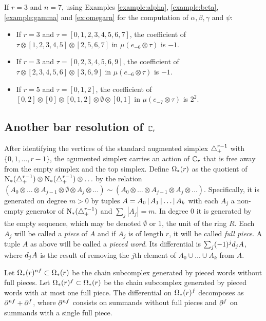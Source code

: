 \begin{example}\label{ex:omegarnfinal} If $r=3$ and $n=7$, using Examples \ref{example:alpha}, \ref{example:beta},  \ref{example:gamma} and \ref{ex:omegarn} for the computation of $\alpha,\beta,\gamma$ and $\psi$:
	\begin{itemize}
		\item If $r = 3$ and $\tau = [0,1,2,3,4,5,6,7]$, the coefficient of $\tau\otimes [1,2,3,4,5]\otimes [2,5,6,7]$ in $\mu(e_{-6}\otimes \tau)$ is $-1$.
		\item If $r = 3$ and $\tau = [0,2,3,4,5,6,9]$, the coefficient of $\tau\otimes [2,3,4,5,6]\otimes [3,6,9]$ in $\mu(e_{-6}\otimes \tau)$ is $-1$.
		\item If $r = 5$ and $\tau = [0,1,2]$, the coefficient of $[0,2]\otimes [0]\otimes [0,1,2]\otimes \emptyset\otimes [0,1]$ in $\mu(e_{-7}\otimes \tau)$ is $2^2$.
	\end{itemize}
\end{example}

\subsection{Another bar resolution of \texorpdfstring{$\mathbb{C}_r$}{the cyclic group}}

After identifying the vertices of the standard augmented simplex $\triangle_{+}^{r-1}$ with $\{0,1,\ldots,r-1\}$, the agumented simplex carries an action of $\mathbb{C}_r$ that is free away from the empty simplex and the top simplex. Define $\operatorname{\Omega}_{*}(r)$ as the quotient of $\operatorname{N}_{*}(\triangle_{+}^{r-1})\otimes \operatorname{N}_{*}(\triangle_{+}^{r-1})\otimes\ldots$ by the relation $(A_0\otimes \ldots \otimes A_{j-1}\otimes \emptyset \otimes A_j\otimes \ldots) \sim (A_0\otimes \ldots \otimes A_{j-1}\otimes A_j \otimes \ldots)$. Specifically, it is generated on degree $m>0$ by tuples $A = A_0\operatorname{|} A_1\operatorname{|}\ldots \operatorname{|} A_k$ with each $A_j$ a non-empty generator of $\operatorname{N}_{*}(\triangle_{+}^{r-1})$ and $\sum_j |A_j| = m$. In degree $0$ it is generated by the empty sequence, which may be denoted $\emptyset$ or $1$, the unit of the ring $R$. Each $A_j$ will be called a \emph{piece} of $A$ and if $A_j$ is of length $r$, it will be called \emph{full piece}. A tuple $A$ as above will be called a \emph{pieced word}. Its differential is $\sum_{j} (-1)^j d_j A$, where $d_jA$ is the result of removing the $j$th element of $A_0\cup \ldots\cup A_k$ from $A$.

Let $\operatorname{\Omega}_{*}(r)^{nf}\subset \operatorname{\Omega}_{*}(r)$ be the chain subcomplex generated by pieced words without full pieces. Let $\operatorname{\Omega}_{*}(r)^{f}\subset \operatorname{\Omega}_{*}(r)$ be the chain subcomplex generated by pieced words with at most one full piece. The differential on $\operatorname{\Omega}_{*}(r)^{f}$ decomposes as $\partial^{nf}+\partial^{f}$, where $\partial^{nf}$ consists on summands without full pieces and $\partial^{f}$ on summands with a single full piece.

